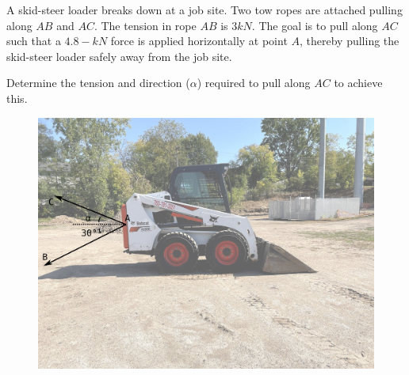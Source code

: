
A skid-steer loader breaks down at a job site.  Two tow ropes are attached pulling along $AB$ and $AC$.  The tension in rope $AB$ is $3 kN$.  The goal is to pull along $AC$ such that a $4.8-kN$ force is applied horizontally at point $A$, thereby pulling the skid-steer loader safely away from the job site.

Determine the tension and direction ($\alpha$) required to pull along $AC$ to achieve this.

\begin{figure}[ht!]
  \centering
  \includegraphics[width=5.0in]{fig.png}
\end{figure}

